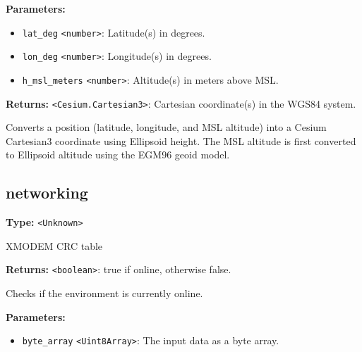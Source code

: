 \documentclass[12pt,a4paper]{article}
\begin{document}
\noindent \textbf{Parameters:}
\begin{itemize}
  \item \texttt{lat\_deg} \texttt{<number>}: Latitude(s) in degrees.
  \item \texttt{lon\_deg} \texttt{<number>}: Longitude(s) in degrees.
  \item \texttt{h\_msl\_meters} \texttt{<number>}: Altitude(s) in meters above MSL.
\end{itemize}

\noindent \textbf{Returns:} \texttt{<Cesium.Cartesian3>}: Cartesian coordinate(s) in the WGS84 system.

\noindent Converts a position (latitude, longitude, and MSL altitude) into a Cesium Cartesian3 coordinate using Ellipsoid height.
The MSL altitude is first converted to Ellipsoid altitude using the EGM96 geoid model.


\subsection{networking}
\vspace{5mm}
\noindent {}\vspace{4mm}


\noindent \textbf{Type:} \texttt{<Unknown>}

\noindent XMODEM CRC table

\vspace{5mm}
\noindent {}


\noindent \textbf{Returns:} \texttt{<boolean>}: \textasciigrave{}true\textasciigrave{} if online, otherwise \textasciigrave{}false\textasciigrave{}.

\noindent Checks if the environment is currently online.

\vspace{5mm}
\noindent {}


\noindent \textbf{Parameters:}
\begin{itemize}
  \item \texttt{byte\_array} \texttt{<Uint8Array>}: The input data as a byte array.
\end{itemize}
\end{document}
